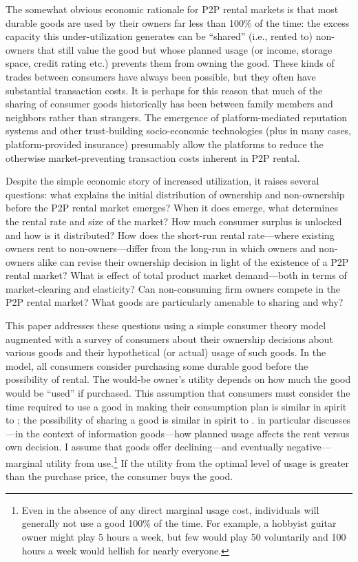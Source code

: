 \documentclass[11pt]{article}
\begin{document}
The somewhat obvious economic rationale for P2P rental markets is that most durable goods are used by their owners far less than 100\% of the time: 
the excess capacity this under-utilization generates can be ``shared'' (i.e., rented to) non-owners that still value the good but whose planned usage (or income, storage space, credit rating etc.) prevents them from owning the good. 
These kinds of trades between consumers have always been possible, but they often have substantial transaction costs.
It is perhaps for this reason that much of the sharing of consumer goods historically has been between family members and neighbors rather than strangers. 
The emergence of platform-mediated reputation systems and other trust-building socio-economic technologies (plus in many cases, platform-provided insurance) presumably allow the platforms to reduce the otherwise market-preventing transaction costs inherent in P2P rental. 

Despite the simple economic story of increased utilization, it raises several questions:
what explains the initial distribution of ownership and non-ownership before the P2P rental market emerges?
When it does emerge, what determines the rental rate and size of the market? 
How much consumer surplus is unlocked and how is it distributed? 
How does the short-run rental rate---where existing owners rent to non-owners---differ from the long-run in which owners and non-owners alike can revise their ownership decision in light of the existence of a P2P rental market?  
What is effect of total product market demand---both in terms of market-clearing and elasticity?  
Can non-consuming firm owners compete in the P2P rental market? 
What goods are particularly amenable to sharing and why?
  
This paper addresses these questions using a simple consumer theory model augmented with a survey of consumers about their ownership decisions about various goods and their hypothetical (or actual) usage of such goods. 
In the model, all consumers consider purchasing some durable good before the possibility of rental.   
The would-be owner's utility depends on how much the good would be ``used'' if purchased. 
This assumption that consumers must consider the time required to use a good in making their consumption plan is similar in spirit to \cite{becker1965theory}; the possibility of sharing a good is similar in spirit to \cite{varian2000}.
\cite{varian2000} in particular discusses---in the context of information goods---how planned usage affects the rent versus own decision.  
I assume that goods offer declining---and eventually negative---marginal utility from use.\footnote{Even in the absence of any direct marginal usage cost, individuals will generally not use a good 100\% of the time. 
For example, a hobbyist guitar owner might play 5 hours a week, but few would play 50 voluntarily and 100 hours a week would hellish for nearly everyone.} 
If the utility from the optimal level of usage is greater than the purchase price, the consumer buys the good. 
\end{document}
